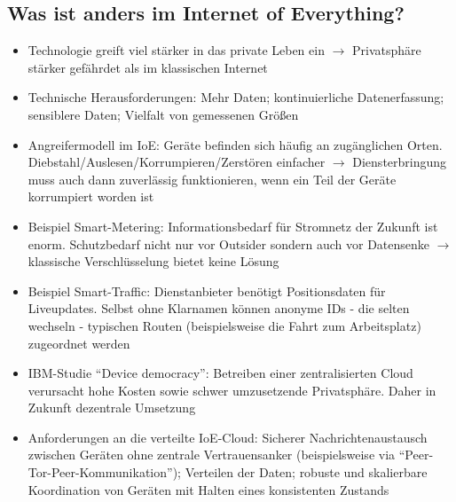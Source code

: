 \subsection{Was ist anders im Internet of Everything?}
\begin{itemize}
	\item Technologie greift viel stärker in das private Leben ein \(\rightarrow\) Privatsphäre stärker gefährdet als im klassischen Internet
	\item Technische Herausforderungen: Mehr Daten; kontinuierliche Datenerfassung; sensiblere Daten; Vielfalt von gemessenen Größen
	\item Angreifermodell im IoE: Geräte befinden sich häufig an zugänglichen Orten. Diebstahl/Auslesen/Korrumpieren/Zerstören einfacher \(\rightarrow\) Diensterbringung muss auch dann zuverlässig funktionieren, wenn ein Teil der Geräte korrumpiert worden ist
	\item Beispiel Smart-Metering: Informationsbedarf für Stromnetz der Zukunft ist enorm. Schutzbedarf nicht nur vor Outsider sondern auch vor Datensenke \(\rightarrow\) klassische Verschlüsselung bietet keine Lösung
	\item Beispiel Smart-Traffic: Dienstanbieter benötigt Positionsdaten für Liveupdates. Selbst ohne Klarnamen können anonyme IDs - die selten wechseln - typischen Routen (beispielsweise die Fahrt zum Arbeitsplatz) zugeordnet werden
	\item IBM-Studie "`Device democracy"': Betreiben einer zentralisierten Cloud verursacht hohe Kosten sowie schwer umzusetzende Privatsphäre. Daher in Zukunft dezentrale Umsetzung
	\item Anforderungen an die verteilte IoE-Cloud: Sicherer Nachrichtenaustausch zwischen Geräten ohne zentrale Vertrauensanker (beispielsweise via "`Peer-Tor-Peer-Kommunikation"'); Verteilen der Daten; robuste und skalierbare Koordination von Geräten mit Halten eines konsistenten Zustands
\end{itemize}


